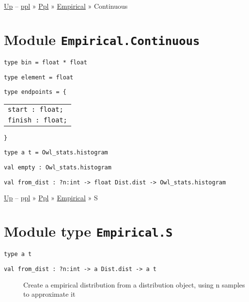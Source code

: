 \href{../index.html}{Up} -- \href{../../../index.html}{ppl} »
\href{../../index.html}{Ppl} » \href{../index.html}{Empirical} »
Continuous

\section{\texorpdfstring{Module
\texttt{Empirical.Continuous}}{Module Empirical.Continuous}}\label{module-empirical.continuous}

\protect\hyperlink{type-bin}{}\texttt{type\ bin}\texttt{\ =\ float\ *\ float}

\protect\hyperlink{type-element}{}\texttt{type\ element}\texttt{\ =\ float}

\protect\hyperlink{type-endpoints}{}\texttt{type\ endpoints}\texttt{\ =\ }\texttt{\{}

\begin{longtable}[c]{@{}l@{}}
\toprule
\protect\hyperlink{type-endpoints.start}{}\texttt{start\ :\ float;}\tabularnewline
\protect\hyperlink{type-endpoints.finish}{}\texttt{finish\ :\ float;}\tabularnewline
\bottomrule
\end{longtable}

\texttt{\}}

\protect\hyperlink{type-t}{}\texttt{type\ \textquotesingle{}a\ t}\texttt{\ =\ Owl\_stats.histogram}

\protect\hyperlink{val-empty}{}\texttt{val\ empty\ :\ Owl\_stats.histogram}

\protect\hyperlink{val-fromux5fdist}{}\texttt{val\ from\_dist\ :\ ?⁠n:int\ -\textgreater{}\ float\ Dist.dist\ -\textgreater{}\ Owl\_stats.histogram}

\href{../index.html}{Up} -- \href{../../../index.html}{ppl} »
\href{../../index.html}{Ppl} » \href{../index.html}{Empirical} » S

\section{\texorpdfstring{Module type
\texttt{Empirical.S}}{Module type Empirical.S}}\label{module-type-empirical.s}

\protect\hyperlink{type-t}{}\texttt{type\ \textquotesingle{}a\ t}

\begin{description}
\item[{\protect\hyperlink{val-fromux5fdist}{}\texttt{val\ from\_dist\ :\ ?⁠n:int\ -\textgreater{}\ \textquotesingle{}a\ Dist.dist\ -\textgreater{}\ \textquotesingle{}a\ t}}]
Create a empirical distribution from a distribution object, using n
samples to approximate it
\end{description}

